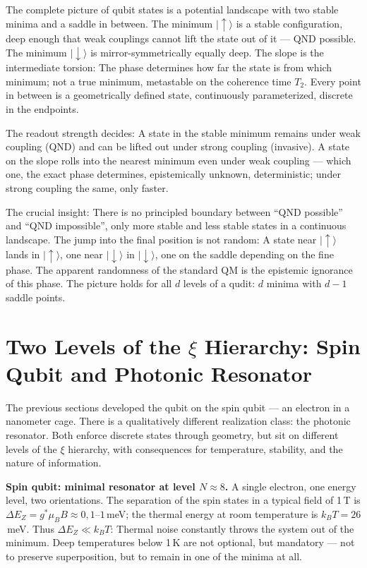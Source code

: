 The complete picture of qubit states is a potential landscape
with two stable minima and a saddle in between. The minimum
$|\uparrow\rangle$ is a stable configuration, deep enough that
weak couplings cannot lift the state out of it --- QND possible. The
minimum $|\downarrow\rangle$ is mirror-symmetrically equally deep. The slope
is the intermediate torsion: The phase determines how far the state is
from which minimum; not a true minimum, metastable on
the coherence time $T_2$. Every point in between is a geometrically
defined state, continuously parameterized, discrete in the
endpoints.

The readout strength decides: A state in the stable minimum remains
under weak coupling (QND) and can be lifted out under strong coupling
(invasive). A state on the slope rolls into the nearest minimum even under weak
coupling --- which one, the exact phase determines,
epistemically unknown, deterministic; under strong coupling the same,
only faster.

The crucial insight: There is no principled boundary between
\enquote{QND possible} and \enquote{QND impossible}, only more stable and
less stable states in a continuous landscape. The jump into the final position is not
random: A state near $|\uparrow\rangle$ lands in $|\uparrow\rangle$, one near
$|\downarrow\rangle$ in $|\downarrow\rangle$, one on the saddle
depending on the fine phase. The apparent randomness of the
standard QM is the epistemic ignorance of this phase. The picture holds
for all $d$ levels of a qudit: $d$ minima with $d-1$ saddle points.

\section{Two Levels of the $\xi$ Hierarchy: Spin Qubit and Photonic Resonator}

The previous sections developed the qubit on the spin qubit ---
an electron in a nanometer cage. There is a qualitatively different
realization class: the photonic resonator. Both enforce discrete
states through geometry, but sit on different levels
of the $\xi$ hierarchy, with consequences for temperature, stability, and
the nature of information.

\textbf{Spin qubit: minimal resonator at level $N\approx8$.} A
single electron, one energy level, two orientations. The separation
of the spin states in a typical field of 1\,T is
$\Delta E_Z = g^*\mu_BB\approx0{,}1$--$1$\,meV; the thermal energy
at room temperature is $k_BT = 26$\,meV. Thus $\Delta E_Z\ll k_BT$:
Thermal noise constantly throws the system out of the minimum. Deep
temperatures below 1\,K are not optional, but mandatory --- not
to preserve superposition, but to remain in one of the minima at all.

